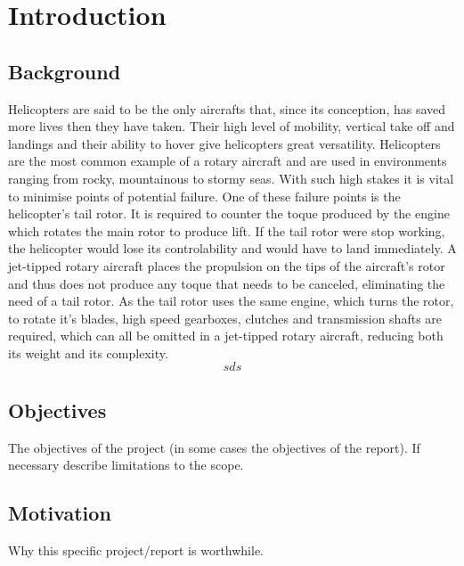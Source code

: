 \chapter{Introduction}

\section{Background}

Helicopters are said to be the only aircrafts that, since its conception, has saved more lives then they have taken. Their  high level of mobility, vertical take off and landings and their ability to hover give helicopters great versatility. Helicopters are the most common example of a rotary aircraft and are used in environments ranging from rocky, mountainous to stormy seas. With such high stakes it is vital to minimise points of potential failure. One of these failure points is the helicopter's tail rotor. It is required to counter the toque produced by the engine which rotates the main rotor to produce lift. If the tail rotor were stop working, the helicopter would lose its controlability and would have to land immediately. A jet-tipped rotary aircraft places the propulsion on the tips of the aircraft's rotor and thus does not produce any toque that needs to be canceled, eliminating the need of a tail rotor. As the tail rotor uses the same engine, which turns the rotor, to rotate it's blades, high speed gearboxes, clutches and transmission shafts are required, which can all be omitted in a jet-tipped rotary aircraft, reducing both its weight and its complexity.  \[sds\]


\section{Objectives}

The objectives of the project (in some cases the objectives of the report). If necessary describe limitations to the scope.

\section{Motivation}

Why this specific project/report is worthwhile.